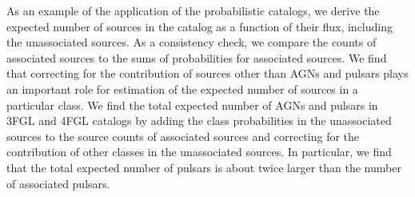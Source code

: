 As an example of the application of the probabilistic catalogs, we derive the expected number of sources in the catalog as a function of their flux, including the unassociated sources.
As a consistency check, we compare the counts of associated sources to the sums of probabilities for associated sources.
We find that correcting for the contribution of sources other than AGNs and pulsars plays an important role for estimation of the expected number of sources in a particular class.
We find the total expected number of AGNs and pulsars in 3FGL and 4FGL catalogs by adding the class probabilities in the unassociated sources to the source counts of associated sources and correcting for the contribution of other classes in the unassociated sources.
In particular, we find that the total expected number of pulsars is about twice larger than the number of associated pulsars.

